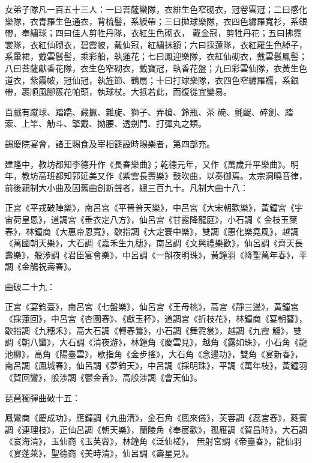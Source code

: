 \begin{pinyinscope}
 女弟子隊凡一百五十三人：一曰菩薩蠻隊，衣緋生色窄砌衣，冠卷雲冠；二曰感化樂隊，衣青羅生色通衣，背梳髻，系綬帶；三曰拋球樂隊，衣四色繡羅寬衫，系銀帶，奉繡球；四曰佳人剪牲丹隊，衣紅生色砌衣，
 戴金冠，剪牲丹花；五曰拂霓裳隊，衣紅仙砌衣，碧霞帔，戴仙冠，紅繡抹額；六曰採蓮隊，衣紅羅生色綽子，系暈裙，戴雲鬟髻，乘彩船，執蓮花；七曰鳳迎樂隊，衣紅仙砌衣，戴雲鬟鳳髻；八曰菩薩獻香花隊，衣生色窄砌衣，戴寶冠，執香花盤；九曰彩雲仙隊，衣黃生色道衣，紫霞帔，冠仙冠，執旌節、鶴扇；十曰打球樂隊，衣四色窄繡羅襦，系銀帶，裹順風腳簇花帕頭，執球杖。大抵若此，而復從宜變易。



 百戲有蹴球、踏蹻、藏擫、雜旋、獅子、弄槍、鈴瓶、茶
 碗、氈齪、碎劍、踏索、上竿、觔斗、擎戴、拗腰、透劍門、打彈丸之類。



 錫慶院宴會，諸王賜食及宰相筵設時賜樂者，第四部充。



 建隆中，教坊都知李德升作《長春樂曲》；乾德元年，又作《萬歲升平樂曲》。明年，教坊高班都知郭延美又作《紫雲長壽樂》鼓吹曲，以奏御焉。太宗洞曉音律，前後親制大小曲及因舊曲創新聲者，總三百九十。凡制大曲十八：



 正宮《平戎破陣樂》，南呂宮《平晉普天樂》，中呂宮《大宋朝歡樂》，黃鐘宮《宇宙荷皇恩》，道調宮《垂衣定八方》，仙呂宮《甘露降龍庭》，小石調《
 金枝玉葉春》，林鐘商《大惠帝恩寬》，歇指調《大定寰中樂》，雙調《惠化樂堯風》，越調《萬國朝天樂》，大石調《嘉禾生九穗》，南呂調《文興禮樂歡》，仙呂調《齊天長壽樂》，般涉調《君臣宴會樂》，中呂調《一斛夜明珠》，黃鐘羽《降聖萬年春》，平調《金觴祝壽春》。



 曲破二十九：



 正宮《宴鈞臺》，南呂宮《七盤樂》，仙呂宮《王母桃》，高宮《靜三邊》，黃鐘宮《採蓮回》，中呂宮《杏園春》、《獻玉杯》，道調宮《折枝花》，林鐘商《宴朝簪》，歇指調《九穗禾》，高大石調《轉春鶯》，小石調《舞霓裳》，越調《九霞
 觴》，雙調《朝八蠻》，大石調《清夜游》，林鐘角《慶雲見》，越角《露如珠》，小石角《龍池柳》，高角《陽臺雲》，歇指角《金步搖》，大石角《念邊功》，雙角《宴新春》，南呂調《鳳城春》，仙呂調《夢鈞天》，中呂調《採明珠》，平調《萬年枝》，黃鐘羽《賀回鸞》，般涉調《鬱金香》，高般涉調《會天仙》。



 琵琶獨彈曲破十五：



 鳳鸞商《慶成功》，應鐘調《九曲清》，金石角《鳳來儀》，芙蓉調《蕊宮春》，蕤賓調《連理枝》，正仙呂調《朝天樂》，蘭陵角《奉宸歡》，孤雁調《賀昌時》，大石調《寰海清》，玉仙商《玉芙蓉》，林鐘角《泛仙槎》，
 無射宮調《帝臺春》，龍仙羽《宴蓬萊》，聖德商《美時清》，仙呂調《壽星見》。




\end{pinyinscope}
